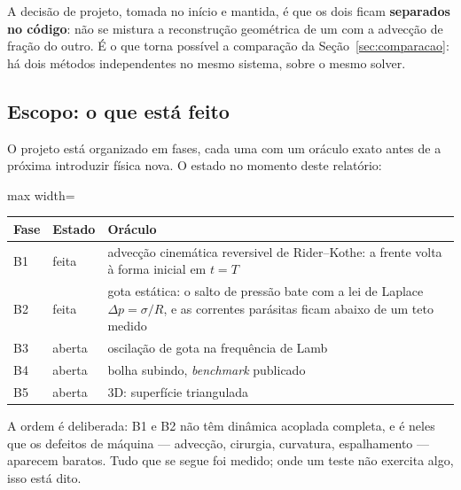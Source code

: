 A decis\~ao de projeto, tomada no in\'icio e mantida, \'e que os dois ficam
\textbf{separados no c\'odigo}: n\~ao se mistura a reconstru\c{c}\~ao geom\'etrica
de um com a advec\c{c}\~ao de fra\c{c}\~ao do outro. \'E o que torna poss\'ivel a
compara\c{c}\~ao da Se\c{c}\~ao~\ref{sec:comparacao}: h\'a dois m\'etodos
independentes no mesmo sistema, sobre o mesmo solver.

\subsection{Escopo: o que est\'a feito}

O projeto est\'a organizado em fases, cada uma com um or\'aculo exato antes de a
pr\'oxima introduzir f\'isica nova. O estado no momento deste relat\'orio:

\begin{center}
\begin{adjustbox}{max width=\linewidth}
\begin{tabular}{llp{7.2cm}}
\toprule
Fase & Estado & Or\'aculo \\
\midrule
B1 & feita & advec\c{c}\~ao cinem\'atica reversivel de Rider--Kothe: a frente
             volta \`a forma inicial em $t=T$ \\
B2 & feita & gota est\'atica: o salto de press\~ao bate com a lei de Laplace
             $\Delta p = \sigma/R$, e as correntes par\'asitas ficam abaixo de um
             teto medido \\
B3 & aberta & oscila\c{c}\~ao de gota na frequ\^encia de Lamb \\
B4 & aberta & bolha subindo, \emph{benchmark} publicado \\
B5 & aberta & 3D: superf\'icie triangulada \\
\bottomrule
\end{tabular}
\end{adjustbox}
\end{center}

A ordem \'e deliberada: B1 e B2 n\~ao t\^em din\^amica acoplada completa, e \'e
neles que os defeitos de m\'aquina --- advec\c{c}\~ao, cirurgia, curvatura,
espalhamento --- aparecem baratos. Tudo que se segue foi medido; onde um teste
n\~ao exercita algo, isso est\'a dito.
